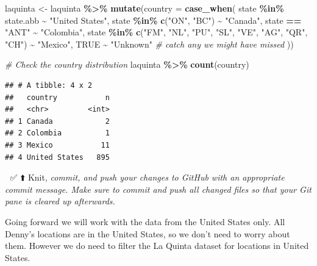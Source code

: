 \documentclass[
]{article}
\newenvironment{Shaded}{\begin{snugshade}}{\end{snugshade}}
\newcommand{\AttributeTok}[1]{\textcolor[rgb]{0.13,0.29,0.53}{#1}}
\newcommand{\CommentTok}[1]{\textcolor[rgb]{0.56,0.35,0.01}{\textit{#1}}}
\newcommand{\ConstantTok}[1]{\textcolor[rgb]{0.56,0.35,0.01}{#1}}
\newcommand{\FunctionTok}[1]{\textcolor[rgb]{0.13,0.29,0.53}{\textbf{#1}}}
\newcommand{\NormalTok}[1]{#1}
\newcommand{\OtherTok}[1]{\textcolor[rgb]{0.56,0.35,0.01}{#1}}
\newcommand{\SpecialCharTok}[1]{\textcolor[rgb]{0.81,0.36,0.00}{\textbf{#1}}}
\newcommand{\StringTok}[1]{\textcolor[rgb]{0.31,0.60,0.02}{#1}}
\begin{document}
\begin{Shaded}
\begin{Highlighting}[]
\NormalTok{laquinta }\OtherTok{\textless{}{-}}\NormalTok{ laquinta }\SpecialCharTok{\%\textgreater{}\%}
  \FunctionTok{mutate}\NormalTok{(}\AttributeTok{country =} \FunctionTok{case\_when}\NormalTok{(}
\NormalTok{    state }\SpecialCharTok{\%in\%}\NormalTok{ state.abb     }\SpecialCharTok{\textasciitilde{}} \StringTok{"United States"}\NormalTok{,}
\NormalTok{    state }\SpecialCharTok{\%in\%} \FunctionTok{c}\NormalTok{(}\StringTok{"ON"}\NormalTok{, }\StringTok{"BC"}\NormalTok{) }\SpecialCharTok{\textasciitilde{}} \StringTok{"Canada"}\NormalTok{,}
\NormalTok{    state }\SpecialCharTok{==} \StringTok{"ANT"}           \SpecialCharTok{\textasciitilde{}} \StringTok{"Colombia"}\NormalTok{,}
\NormalTok{    state }\SpecialCharTok{\%in\%} \FunctionTok{c}\NormalTok{(}\StringTok{"FM"}\NormalTok{, }\StringTok{"NL"}\NormalTok{, }\StringTok{"PU"}\NormalTok{, }\StringTok{"SL"}\NormalTok{, }\StringTok{"VE"}\NormalTok{, }\StringTok{"AG"}\NormalTok{, }\StringTok{"QR"}\NormalTok{, }\StringTok{"CH"}\NormalTok{) }\SpecialCharTok{\textasciitilde{}} \StringTok{"Mexico"}\NormalTok{,}
    \ConstantTok{TRUE}                     \SpecialCharTok{\textasciitilde{}} \StringTok{"Unknown"}  \CommentTok{\# catch any we might have missed}
\NormalTok{  ))}

\CommentTok{\# Check the country distribution}
\NormalTok{laquinta }\SpecialCharTok{\%\textgreater{}\%}
  \FunctionTok{count}\NormalTok{(country)}
\end{Highlighting}
\end{Shaded}

\begin{verbatim}
## # A tibble: 4 x 2
##   country           n
##   <chr>         <int>
## 1 Canada            2
## 2 Colombia          1
## 3 Mexico           11
## 4 United States   895
\end{verbatim}

🧶 ✅ ⬆️ Knit, \emph{commit, and push your changes to GitHub with an
appropriate commit message. Make sure to commit and push all changed
files so that your Git pane is cleared up afterwards.}

Going forward we will work with the data from the United States only.
All Denny's locations are in the United States, so we don't need to
worry about them. However we do need to filter the La Quinta dataset for
locations in United States.
\end{document}
